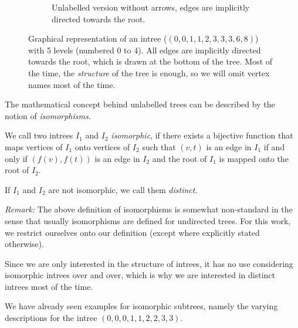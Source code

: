 \begin{figure}[t]
\begin{subfigure}{.45\textwidth}
    \caption{Unlabelled version without arrows, edges are implicitly directed towards the root.}
    \label{fig:intree-example-structure-version}
  \end{subfigure}
  \caption{Graphical representation of an intree ($(0,0,1,1,2,3,3,3,6,8)$) with 5 levels (numbered 0 to 4). All edges are implicitly directed towards the root, which is drawn at the bottom of the tree. Most of the time, the \emph{structure} of the tree is enough, so we will omit vertex names most of the time.}
  \label{fig:intrees-introductory-explanation}
\end{figure}

The mathematical concept behind unlabelled trees can be described by the notion of \emph{isomorphisms}.

\begin{definition}
  We call two intrees $I_1$ and $I_2$ \emph{isomorphic}, if there exists a bijective function that maps vertices of $I_1$ onto vertices of $I_2$ such that $(v,t)$ is an edge in $I_1$ if and only if $(f(v), f(t))$ is an edge in $I_2$ and the root of $I_1$ is mapped onto the root of $I_2$.

  If $I_1$ and $I_2$ are not isomorphic, we call them \emph{distinct}.
\end{definition}

\emph{Remark:} The above definition of isomorphisms is somewhat non-standard in the sense that usually isomorphisms are defined for undirected trees. For this work, we restrict ourselves onto our definition (except where explicitly stated otherwise).

Since we are only interested in the structure of intrees, it has no use considering isomorphic intrees over and over, which is why we are interested in distinct intrees most of the time.

We have already seen examples for isomorphic subtrees, namely the varying descriptions for the intree $(0,0,0,1,1,2,2,3,3)$.

